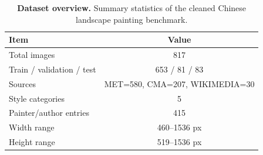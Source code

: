 \begin{table}[t]
\centering
\small
\caption{\textbf{Dataset overview.} Summary statistics of the cleaned Chinese landscape painting benchmark.}
\label{tab:dataset-overview}
\begin{tabular}{lc}
\toprule
\textbf{Item} & \textbf{Value} \\
\midrule
Total images & 817 \\
Train / validation / test & 653 / 81 / 83 \\
Sources & MET=580, CMA=207, WIKIMEDIA=30 \\
Style categories & 5 \\
Painter/author entries & 415 \\
Width range & 460--1536 px \\
Height range & 519--1536 px \\
\bottomrule
\end{tabular}
\end{table}
